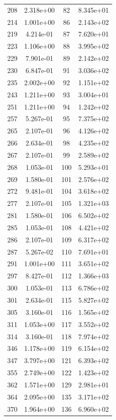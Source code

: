 \documentclass[12pt]{article}
\begin{document}
\begin{longtable}{@{}cccc@{}}
208 & 2.318e+00 & 82 & 8.345e+01 \\
214 & 1.001e+00 & 86 & 2.143e+02 \\
219 & 4.214e-01 & 87 & 7.620e+01 \\
223 & 1.106e+00 & 88 & 3.995e+02 \\
229 & 7.901e-01 & 89 & 2.142e+02 \\
230 & 6.847e-01 & 91 & 3.036e+02 \\
235 & 2.002e+00 & 92 & 1.151e+02 \\
243 & 1.211e+00 & 93 & 3.004e+01 \\
251 & 1.211e+00 & 94 & 1.242e+02 \\
257 & 5.267e-01 & 95 & 7.375e+02 \\
265 & 2.107e-01 & 96 & 4.126e+02 \\
266 & 2.634e-01 & 98 & 4.235e+02 \\
267 & 2.107e-01 & 99 & 2.589e+02 \\
268 & 1.053e-01 & 100 & 5.293e+01 \\
269 & 1.580e-01 & 101 & 2.576e+02 \\
272 & 9.481e-01 & 104 & 3.618e+02 \\
277 & 2.107e-01 & 105 & 1.321e+03 \\
281 & 1.580e-01 & 106 & 6.502e+02 \\
285 & 1.053e-01 & 108 & 4.421e+02 \\
286 & 2.107e-01 & 109 & 6.317e+02 \\
287 & 5.267e-02 & 110 & 7.691e+01 \\
291 & 1.001e+00 & 111 & 3.651e+02 \\
297 & 8.427e-01 & 112 & 1.366e+03 \\
300 & 1.053e-01 & 113 & 6.786e+02 \\
301 & 2.634e-01 & 115 & 5.827e+02 \\
305 & 3.160e-01 & 116 & 1.565e+02 \\
311 & 1.053e+00 & 117 & 3.552e+02 \\
314 & 3.160e-01 & 118 & 7.974e+02 \\
346 & 1.178e+00 & 119 & 6.154e+02 \\
347 & 3.797e+00 & 121 & 6.393e+02 \\
355 & 2.749e+00 & 122 & 1.423e+02 \\
362 & 1.571e+00 & 129 & 2.981e+01 \\
364 & 2.095e+00 & 135 & 3.171e+02 \\
370 & 1.964e+00 & 136 & 6.960e+02 \\

\end{longtable}
\end{document}
